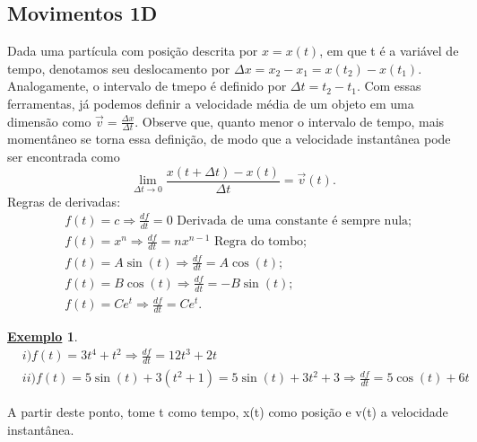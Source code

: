 \documentclass{article}
\newtheorem{example}{\underline{Exemplo}}
\begin{document}
\subsection{Movimentos 1D}
  Dada uma part\'icula com posi\c c\~ao descrita por $x = x(t)$, em que t \'e a vari\'avel de tempo, denotamos seu deslocamento
por $\Delta x = x_{2} - x_{1} = x(t_{2}) - x(t_{1}).$ Analogamente, o intervalo de tmepo \'e definido por $\Delta t = t_{2} - t_{1}$.
Com essas ferramentas, j\'a podemos definir a velocidade m\'edia de um objeto em uma dimens\~ao como $\vec{v} = \frac{\Delta x}{\Delta t}.$
Observe que, quanto menor o intervalo de tempo, mais moment\^aneo se torna essa defini\c c\~ao, de modo que a velocidade instant\^anea
pode ser encontrada como 
  $$
    \lim_{\Delta t\to0}\frac{x(t + \Delta t) - x(t)}{\Delta t} = \vec{v}(t).
  $$
Regras de derivadas:
\begin{align*}
  &f(t) = c \Rightarrow \frac{df}{dt} = 0 \text{ Derivada de uma constante \'e sempre nula;}\\
  &f(t) = x^{n} \Rightarrow \frac{df}{dt} = nx^{n-1} \text{ Regra do tombo;}\\
  &f(t) = A\sin{(t)} \Rightarrow \frac{df}{dt} = A\cos{(t)};\\
  &f(t) = B\cos{(t)} \Rightarrow \frac{df}{dt} = -B\sin{(t)};\\
  &f(t) = C e^{t} \Rightarrow \frac{df}{dt} = C e^{t}.
\end{align*}
\begin{example}
 \begin{align*}
   &i)f(t) = 3t^{4} + t^{2} \Rightarrow \frac{df}{dt} = 12t^{3} + 2t\\
   &ii) f(t) = 5\sin{(t)} + 3(t^{2}+1) = 5\sin{(t)} + 3t^{2} + 3 \Rightarrow \frac{df}{dt} = 5\cos{(t)} + 6t 
 \end{align*} 
\end{example}

  A partir deste ponto, tome t como tempo, x(t) como posi\c c\~ao e v(t) a velocidade instant\^anea.

\end{document}
